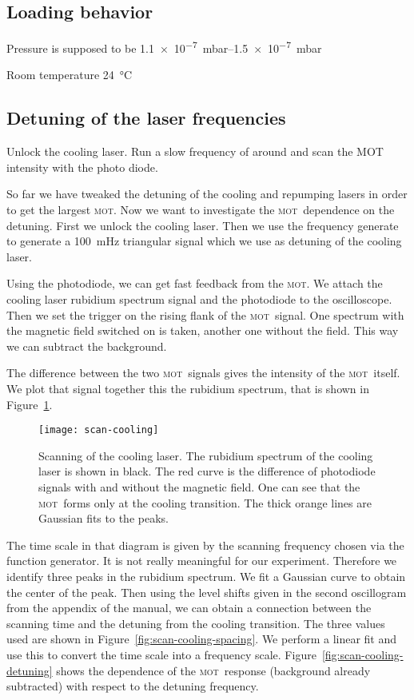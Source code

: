 \documentclass[11pt, english, fleqn, DIV=15, headinclude, BCOR=2cm]{scrreprt}
\newcommand\mot{\textsc{mot}}
\begin{document}
\subsection{Loading behavior}

Pressure is supposed to be \SIrange{1.1e-7}{1.5e-7}{\milli\bar}

Room temperature \SI{24}{\celsius}

\subsection{Detuning of the laser frequencies}

Unlock the cooling laser. Run a slow frequency of around
and scan the MOT intensity with the photo diode. 

So far we have tweaked the detuning of the cooling and repumping lasers in
order to get the largest \mot. Now we want to investigate the \mot\ dependence
on the detuning. First we unlock the cooling laser. Then we use the frequency
generate to generate a \SI{100}{\milli\hertz} triangular signal which we use
as detuning of the cooling laser.

Using the photodiode, we can get fast feedback from the \mot. We attach the
cooling laser rubidium spectrum signal and the photodiode to the oscilloscope.
Then we set the trigger on the rising flank of the \mot\ signal. One spectrum
with the magnetic field switched on is taken, another one without the field.
This way we can subtract the background.

The difference between the two \mot\ signals gives the intensity of the \mot\
itself. We plot that signal together this the rubidium spectrum, that is shown
in Figure~\ref{fig:scan-cooling}.


\begin{figure}
    \centering
    \texttt{[image: scan-cooling]}
    \caption{%
        Scanning of the cooling laser. The rubidium spectrum of the cooling
        laser is shown in black. The red curve is the difference of photodiode
        signals with and without the magnetic field. One can see that the \mot\
        forms only at the cooling transition. The thick orange lines are
        Gaussian fits to the peaks.
    }
    \label{fig:scan-cooling}
\end{figure}

The time scale in that diagram is given by the scanning frequency chosen via
the function generator. It is not really meaningful for our experiment.
Therefore we identify three peaks in the rubidium spectrum. We fit a Gaussian
curve to obtain the center of the peak. Then using the level shifts given in
the second oscillogram from the appendix of the manual, we can obtain a
connection between the scanning time and the detuning from the cooling
transition. The three values used are shown in
Figure~\ref{fig:scan-cooling-spacing}. We perform a linear fit and use this to
convert the time scale into a frequency scale.
Figure~\ref{fig:scan-cooling-detuning} shows the dependence of the \mot\
response (background already subtracted) with respect to the detuning
frequency.
\end{document}
